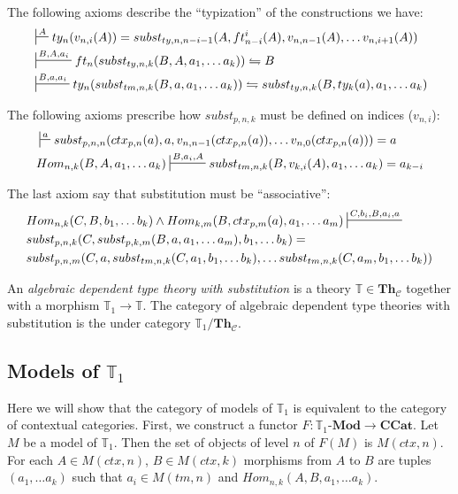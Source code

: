 \documentclass[reqno]{amsart}
\theoremstyle{definition}
\theoremstyle{remark}
\newcommand{\cat}[1]{\mathbf{#1}}
\newcommand{\ccat}{\cat{CCat}}
\newcommand{\Mod}[1]{#1\text{-}\cat{Mod}}
\newcommand{\Th}{\cat{Th}}
\newcommand{\ThC}{\Th_{\mathcal{C}}}
\numberwithin{figure}{section}
\begin{document}
The following axioms describe the ``typization'' of the constructions we have:
\begin{align}
\label{ax:type-var}
& \sststile{}{A}         ty_n(v_{n,i}(A)) = subst_{ty,n,n-i-1}(A, ft^i_{n-i}(A), v_{n,n-1}(A), \ldots v_{n,i+1}(A)) \\
\label{ax:type-subst-ty}
& \sststile{}{B, A, a_i} ft_n(subst_{ty,n,k}(B, A, a_1, \ldots a_k)) \leftrightharpoons B \\
\label{ax:type-subst-tm}
& \sststile{}{B, a, a_i} ty_n(subst_{tm,n,k}(B, a, a_1, \ldots a_k)) \leftrightharpoons subst_{ty,n,k}(B, ty_k(a), a_1, \ldots a_k)
\end{align}

The following axioms prescribe how $subst_{p,n,k}$ must be defined on indices ($v_{n,i}$):
\begin{align}
\label{ax:subst-var}
& \sststile{}{a}         subst_{p,n,n}(ctx_{p,n}(a), a, v_{n,n-1}(ctx_{p,n}(a)), \ldots v_{n,0}(ctx_{p,n}(a))) = a \\
\label{ax:var-subst}
& Hom_{n,k}(B, A, a_1, \ldots a_k) \sststile{}{B, a_i, A} subst_{tm,n,k}(B, v_{k,i}(A), a_1, \ldots a_k) = a_{k-i}
\end{align}

The last axiom say that substitution must be ``associative'':
\begin{align}
\label{ax:subst-subst}
& Hom_{n,k}(C, B, b_1, \ldots b_k) \land Hom_{k,m}(B, ctx_{p,m}(a), a_1, \ldots a_m) \sststile{}{C, b_i, B, a_i, a} \\ \notag
& subst_{p,n,k}(C, subst_{p,k,m}(B, a, a_1, \ldots a_m), b_1, \ldots b_k) = \\ \notag
& subst_{p,n,m}(C, a, subst_{tm,n,k}(C, a_1, b_1, \ldots b_k), \ldots subst_{tm,n,k}(C, a_m, b_1, \ldots b_k))
\end{align}

\begin{defn}
An \emph{algebraic dependent type theory with substitution} is a theory $\mathbb{T} \in \ThC$ together with a morphism $\mathbb{T}_1 \to \mathbb{T}$.
The category of algebraic dependent type theories with substitution is the under category $\mathbb{T}_1/\ThC$.
\end{defn}

\subsection{Models of $\mathbb{T}_1$}

Here we will show that the category of models of $\mathbb{T}_1$ is equivalent to the category of contextual categories.
First, we construct a functor $F : \Mod{\mathbb{T}_1} \to \ccat$.
Let $M$ be a model of $\mathbb{T}_1$.
Then the set of objects of level $n$ of $F(M)$ is $M(ctx,n)$.
For each $A \in M(ctx,n)$, $B \in M(ctx,k)$ morphisms from $A$ to $B$ are tuples $(a_1, \ldots a_k)$ such that $a_i \in M(tm,n)$ and $Hom_{n,k}(A, B, a_1, \ldots a_k)$.
\end{document}
